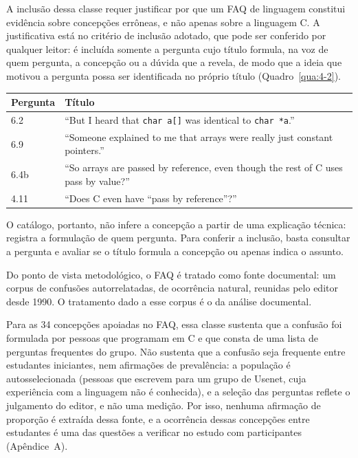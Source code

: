 A inclusão dessa classe requer justificar por que um FAQ de linguagem constitui evidência sobre concepções errôneas, e não apenas sobre a linguagem C. A justificativa está no critério de inclusão adotado, que pode ser conferido por qualquer leitor: é incluída somente a pergunta cujo título formula, na voz de quem pergunta, a concepção ou a dúvida que a revela, de modo que a ideia que motivou a pergunta possa ser identificada no próprio título (Quadro~\ref{qua:4-2}).

\begin{quadro}[htbp]
\caption{Exemplos de perguntas do FAQ cujo título formula a concepção na voz de quem pergunta}\label{qua:4-2}
\footnotesize
\begin{tabularx}{\textwidth}{|l|X|}
\hline
\textbf{Pergunta} & \textbf{Título} \\ \hline
6.2 & ``But I heard that \texttt{char a[]} was identical to \texttt{char *a}.'' \\ \hline
6.9 & ``Someone explained to me that arrays were really just constant pointers.'' \\ \hline
6.4b & ``So arrays are passed by reference, even though the rest of C uses pass by value?'' \\ \hline
4.11 & ``Does C even have ``pass by reference''?'' \\ \hline
\end{tabularx}
\end{quadro}

O catálogo, portanto, não infere a concepção a partir de uma explicação técnica: registra a formulação de quem pergunta. Para conferir a inclusão, basta consultar a pergunta e avaliar se o título formula a concepção ou apenas indica o assunto.

Do ponto de vista metodológico, o FAQ é tratado como fonte documental: um corpus de confusões autorrelatadas, de ocorrência natural, reunidas pelo editor desde 1990. O tratamento dado a esse corpus é o da análise documental.

Para as 34 concepções apoiadas no FAQ, essa classe sustenta que a confusão foi formulada por pessoas que programam em C e que consta de uma lista de perguntas frequentes do grupo. Não sustenta que a confusão seja frequente entre estudantes iniciantes, nem afirmações de prevalência: a população é autosselecionada (pessoas que escrevem para um grupo de Usenet, cuja experiência com a linguagem não é conhecida), e a seleção das perguntas reflete o julgamento do editor, e não uma medição. Por isso, nenhuma afirmação de proporção é extraída dessa fonte, e a ocorrência dessas concepções entre estudantes é uma das questões a verificar no estudo com participantes (Apêndice~A).

